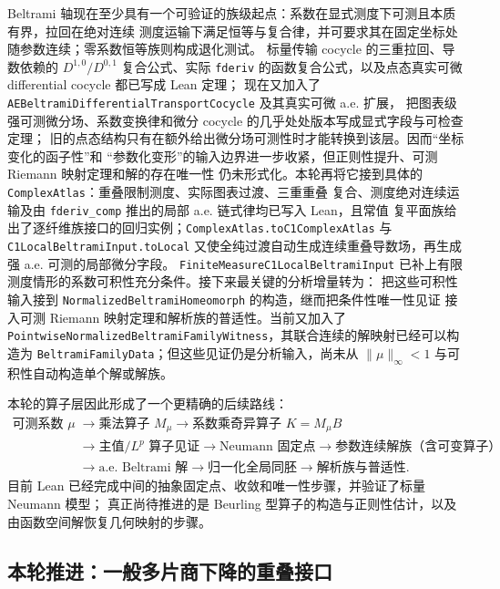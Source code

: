 \documentclass[UTF8,fontset=none,a4paper,11pt]{ctexart}
\begin{document}
Beltrami 轴现在至少具有一个可验证的族级起点：系数在显式测度下可测且本质有界，拉回在绝对连续
测度运输下满足恒等与复合律，并可要求其在固定坐标处随参数连续；零系数恒等族则构成退化测试。
标量传输 cocycle 的三重拉回、导数依赖的 \(D^{1,0}/D^{0,1}\) 复合公式、实际
\texttt{fderiv} 的函数复合公式，以及点态真实可微 differential cocycle 都已写成 Lean 定理；
现在又加入了 \texttt{AEBeltramiDifferentialTransportCocycle} 及其真实可微 a.e. 扩展，
把图表级强可测微分场、系数变换律和微分 cocycle 的几乎处处版本写成显式字段与可检查定理；
旧的点态结构只有在额外给出微分场可测性时才能转换到该层。因而“坐标变化的函子性”和
“参数化变形”的输入边界进一步收紧，但正则性提升、可测 Riemann 映射定理和解的存在唯一性
仍未形式化。本轮再将它接到具体的 \texttt{ComplexAtlas}：重叠限制测度、实际图表过渡、三重重叠
复合、测度绝对连续运输及由 \texttt{fderiv\_comp} 推出的局部 a.e. 链式律均已写入 Lean，且常值
复平面族给出了逐纤维族接口的回归实例；\texttt{ComplexAtlas.toC1ComplexAtlas} 与
\texttt{C1LocalBeltramiInput.toLocal} 又使全纯过渡自动生成连续重叠导数场，再生成强 a.e. 可测的局部微分字段。
\texttt{FiniteMeasureC1LocalBeltramiInput} 已补上有限测度情形的系数可积性充分条件。接下来最关键的分析增量转为：
把这些可积性输入接到 \texttt{NormalizedBeltramiHomeomorph} 的构造，继而把条件性唯一性见证
接入可测 Riemann 映射定理和解析族的普适性。当前又加入了
\texttt{PointwiseNormalizedBeltramiFamilyWitness}，其联合连续的解映射已经可以构造为
\texttt{BeltramiFamilyData}；但这些见证仍是分析输入，尚未从
\(\|\mu\|_\infty<1\) 与可积性自动构造单个解或解族。

本轮的算子层因此形成了一个更精确的后续路线：
\[
\begin{aligned}
\text{可测系数 }\mu
&\longrightarrow \text{乘法算子 }M_\mu
 \longrightarrow \text{系数乘奇异算子 }K=M_\mu B\\
&\longrightarrow \text{主值/\(L^p\) 算子见证}
 \longrightarrow \text{Neumann 固定点}
 \longrightarrow \text{参数连续解族（含可变算子）}\\
&\longrightarrow \text{a.e. Beltrami 解}
 \longrightarrow \text{归一化全局同胚}
 \longrightarrow \text{解析族与普适性}.
\end{aligned}
\]
目前 Lean 已经完成中间的抽象固定点、收敛和唯一性步骤，并验证了标量 Neumann 模型；
真正尚待推进的是 Beurling 型算子的构造与正则性估计，以及由函数空间解恢复几何映射的步骤。

\subsection{本轮推进：一般多片商下降的重叠接口}
\end{document}
